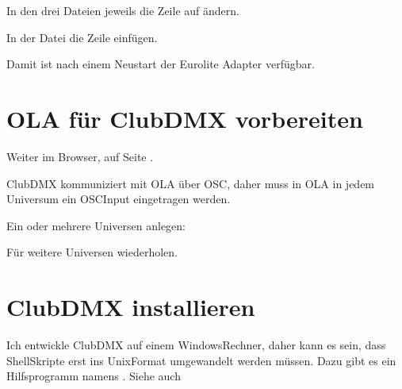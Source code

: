 \documentclass[letterpaper,10pt,ngerman]{sphinxmanual}
\begin{document}
In den drei Dateien
 jeweils die Zeile
 auf  ändern.

In der Datei  die Zeile 
einfügen.

Damit ist nach einem Neustart der Eurolite Adapter verfügbar.


\section{OLA für ClubDMX vorbereiten}
\label{\detokenize{raspberry:ola-fur-clubdmx-vorbereiten}}
Weiter im Browser, auf Seite .

ClubDMX kommuniziert mit OLA über OSC, daher muss in OLA in jedem Universum
ein OSC\sphinxhyphen{}Input eingetragen werden.

Ein oder mehrere Universen anlegen:

\begin{sphinxVerbatim}[commandchars=\\\{\}]
   
  
  
        
    
\end{sphinxVerbatim}

Für weitere Universen wiederholen.


\section{ClubDMX installieren}
\label{\detokenize{raspberry:clubdmx-installieren}}
Ich entwickle ClubDMX auf einem Windows\sphinxhyphen{}Rechner, daher kann es sein, dass
Shell\sphinxhyphen{}Skripte erst ins Unix\sphinxhyphen{}Format umgewandelt werden müssen. Dazu gibt es
ein Hilfsprogramm namens . Siehe auch
\end{document}
